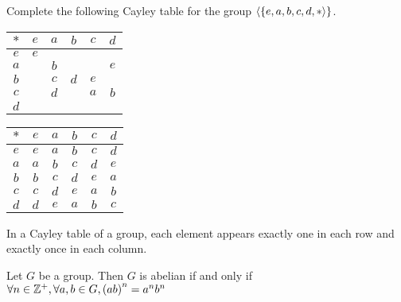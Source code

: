 \begin{exercise}
    Complete the following Cayley table for the group $\langle \qty{e, a, b, c, d, \ast \rangle}$.
    \begin{center}
        \begin{tabular}{|c|c|c|c|c|c|}
             \hline
             $\ast$ & $e$ & $a$ & $b$ & $c$ & $d$ \\
             \hline 
             $e$ & $e$ &  &  &  & \\
             \hline 
             $a$ &  & $b$ &  &  & $e$ \\
             \hline 
             $b$ &  & $c$ & $d$ & $e$ &  \\
             \hline 
             $c$ &  & $d$ & & $a$ & $b$ \\
             \hline 
             $d$ &  &  &  & &  \\
             \hline
        \end{tabular}
    \end{center}

\end{exercise}

\begin{solution} \phantom{blank}
    \begin{center}
        \begin{tabular}{|c|c|c|c|c|c|}
             \hline
             $\ast$ & $e$ & $a$ & $b$ & $c$ & $d$ \\
             \hline 
             $e$ & $e$ & $a$ & $b$ & $c$ & $d$ \\
             \hline 
             $a$ & $a$ & $b$ & $c$ & $d$ & $e$ \\
             \hline 
             $b$ & $b$ & $c$ & $d$ & $e$ & $a$ \\
             \hline 
             $c$ & $c$ & $d$ & $e$ & $a$ & $b$ \\
             \hline 
             $d$ & $d$ & $e$ & $a$ & $b$ & $c$ \\
             \hline
        \end{tabular}
    \end{center}
\end{solution}

\begin{corollary}
    In a Cayley table of a group, each element appears exactly one in each row and exactly once in each column.
\end{corollary}

\begin{theorem}
    Let $G$ be a group. Then $G$ is abelian if and only if $\forall n  \in \mathbb{Z}^+, \forall a, b \in G, \qty(ab)^n= a^nb^n$
\end{theorem}

